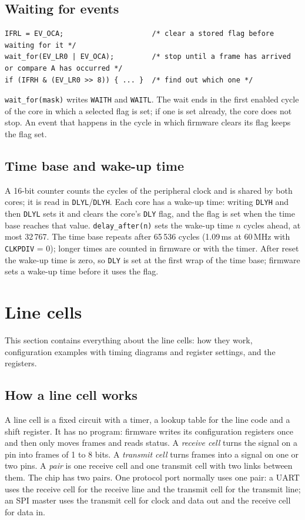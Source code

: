 \documentclass[10pt,a4paper]{article}
\newcommand{\reg}[1]{\texttt{#1}}
\begin{document}
\subsection{Waiting for events}

\begin{lstlisting}
IFRL = EV_OCA;                     /* clear a stored flag before waiting for it */
wait_for(EV_LR0 | EV_OCA);         /* stop until a frame has arrived or compare A has occurred */
if (IFRH & (EV_LR0 >> 8)) { ... }  /* find out which one */
\end{lstlisting}

\texttt{wait\_for(mask)} writes \reg{WAITH} and \reg{WAITL}. The wait ends in the first enabled cycle of the core in
which a selected flag is set; if one is set already, the core does not stop. An event that happens in the cycle
in which firmware clears its flag keeps the flag set.

\subsection{Time base and wake-up time}

A 16-bit counter counts the cycles of the peripheral clock and is shared by both cores; it is read in
\reg{DLYL}/\reg{DLYH}. Each core has a wake-up time: writing \reg{DLYH} and then \reg{DLYL} sets it and clears the
core's \reg{DLY} flag, and the flag is set when the time base reaches that value. \texttt{delay\_after(n)} sets the
wake-up time $n$ cycles ahead, at most 32\,767. The time base repeats after 65\,536 cycles (1.09\,ms at
60\,MHz with \reg{CLKPDIV} = 0); longer times are counted in firmware or with the timer. After reset the wake-up
time is zero, so \reg{DLY} is set at the first wrap of the time base; firmware sets a wake-up time before it
uses the flag.

\section{Line cells}\label{sec:lc}

This section contains everything about the line cells: how they work, configuration examples with timing
diagrams and register settings, and the registers.

\subsection{How a line cell works}

A line cell is a fixed circuit with a timer, a lookup table for the line code and a shift register. It has no
program: firmware writes its configuration registers once and then only moves frames and reads status. A
\emph{receive cell} turns the signal on a pin into frames of 1 to 8 bits. A \emph{transmit cell} turns frames
into a signal on one or two pins. A \emph{pair} is one receive cell and one transmit cell with two links between
them. The chip has two pairs. One protocol port normally uses one pair: a UART uses the receive cell for the
receive line and the transmit cell for the transmit line; an SPI master uses the transmit cell for clock and
data out and the receive cell for data in.
\end{document}
